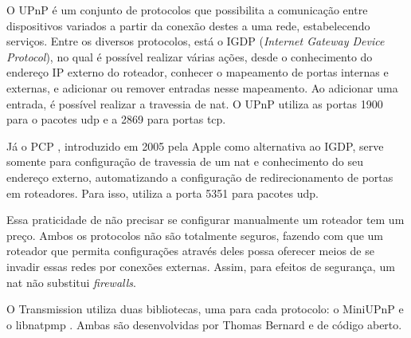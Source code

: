 O UPnP \cite{wiki:upnp} é um conjunto de protocolos que possibilita a comunicação entre
dispositivos variados a partir da conexão destes a uma rede, estabelecendo serviços.
Entre os diversos protocolos, está o IGDP (\emph{Internet Gateway Device Protocol}), no
qual é possível realizar várias ações, desde o conhecimento do endereço IP externo do
roteador, conhecer o mapeamento de portas internas e externas, e adicionar ou remover
entradas nesse mapeamento. Ao adicionar uma entrada, é possível realizar a travessia de
\gls*{nat}. O UPnP utiliza as portas 1900 para o pacotes \gls*{udp} e a 2869 para portas
\gls*{tcp}.

Já o PCP \cite{wiki:pcp}, introduzido em 2005 pela Apple como alternativa ao IGDP,
serve somente para configuração de travessia de um \gls*{nat} e conhecimento do seu
endereço externo, automatizando a configuração de redirecionamento de portas em
roteadores. Para isso, utiliza a porta 5351 para pacotes \gls*{udp}.

Essa praticidade de não precisar se configurar manualmente um roteador tem um preço.
Ambos os protocolos não são totalmente seguros, fazendo com que um roteador que permita
configurações através deles possa oferecer meios de se invadir essas redes por conexões
externas. Assim, para efeitos de segurança, um \gls*{nat} não substitui \emph{firewalls}.

O Transmission utiliza duas bibliotecas, uma para cada protocolo: o MiniUPnP
\cite{site:miniupnp} e o libnatpmp \cite{site:libnatpmp}. Ambas são desenvolvidas por
Thomas Bernard e de código aberto.